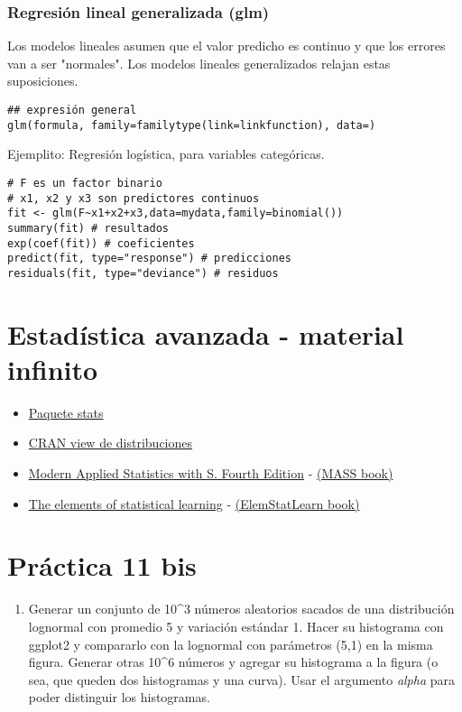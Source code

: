 \documentclass[11pt]{article}
\begin{document}
\subsubsection*{Regresión lineal generalizada (glm)}
\label{sec:org15278a8}

Los modelos lineales asumen que el valor predicho es continuo y que los errores van a ser
"normales". Los modelos lineales generalizados relajan estas suposiciones.

\begin{verbatim}
## expresión general
glm(formula, family=familytype(link=linkfunction), data=)
\end{verbatim}

Ejemplito: Regresión logística, para variables categóricas.

\begin{verbatim}
# F es un factor binario
# x1, x2 y x3 son predictores continuos 
fit <- glm(F~x1+x2+x3,data=mydata,family=binomial())
summary(fit) # resultados
exp(coef(fit)) # coeficientes
predict(fit, type="response") # predicciones
residuals(fit, type="deviance") # residuos 

\end{verbatim}
\section*{Estadística avanzada - material infinito}
\label{sec:org2f122af}
\begin{itemize}
\item \href{https://stat.ethz.ch/R-manual/R-devel/library/stats/html/00Index.html}{Paquete stats}
\item \href{https://cran.r-project.org/web/views/Distributions.html}{CRAN view de distribuciones}
\item \href{https://www.stats.ox.ac.uk/pub/MASS4/}{Modern Applied Statistics with S. Fourth Edition} - \href{https://cran.r-project.org/web/packages/MASS/index.html}{(MASS book)}
\item \href{http://statweb.stanford.edu/\~tibs/ElemStatLearn/}{The elements of statistical learning} - \href{https://cran.r-project.org/web/packages/ElemStatLearn/index.html}{(ElemStatLearn book)}
\end{itemize}
\section*{Práctica 11 bis}
\label{sec:org32d71c2}
\begin{enumerate}
\item Generar un conjunto de 10\^{}3 números aleatorios sacados de una distribución lognormal con promedio
5 y variación estándar 1. Hacer su histograma con ggplot2 y compararlo con la lognormal con
parámetros (5,1) en la misma figura. Generar otras 10\^{}6 números y agregar su histograma a la
figura (o sea, que queden dos histogramas y una curva). Usar el argumento \emph{alpha} para poder
distinguir los histogramas.
\end{enumerate}
\end{document}
